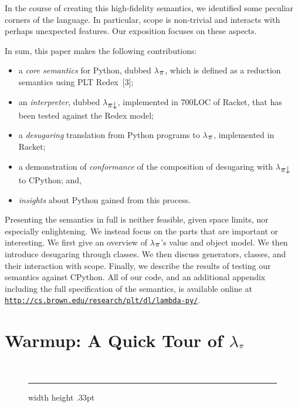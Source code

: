 \documentclass[10pt]{sigplanconf}
\newcommand{\sectionNewpage}{}
\newcommand{\textsub}[1]{$_{\hbox{\textsmaller{#1}}}$}
\newcommand{\Larger}[1]{\textlarger{#1}}
\newlength{\stabLeft}
\newcommand{\atItemizeStart}[0]{\addtolength{\stabLeft}{\labelsep}
                                \addtolength{\stabLeft}{\labelwidth}}
\let\SOriginalthesubsection\thesubsection
\newcommand{\Ssection}[2]{\section[#1]{#2}\let\thesubsection\SOriginalthesubsection}
\newcommand{\Snolinkurl}[1]{\nolinkurl{#1}}
\newcommand{\Legend}[1]{~

                        \hrule width \hsize height .33pt
                        \vspace{4pt}
                        \legend{#1}}
\newcommand{\FigureTarget}[2]{#1}
\newlength{\FigOrigskip}
\newenvironment{Figure}{\begin{figure}}{\end{figure}}
\newenvironment{Centerfigure}{\begin{Xfigure}\centering\item}{\end{Xfigure}}
\newenvironment{Xfigure}{\begin{list}{}{\leftmargin=0pt\topsep=0pt\parsep=\FigOrigskip\partopsep=0pt}}{\end{list}}
\newenvironment{FigureInside}{}{}
\newcommand{\Centertext}[1]{\begin{center}#1\end{center}}
\begin{document}
In the course of creating this high{-}fidelity semantics, we
identified some peculiar corners of the language.
In particular, scope is
non{-}trivial and interacts with perhaps unexpected features. Our
exposition focuses on these aspects.

In sum, this paper makes the following contributions:


\noindent \begin{itemize}\atItemizeStart

\item a \textit{core semantics} for Python, dubbed $\lambda$\textsub{\Larger{$\pi$}}, which
is defined as a reduction semantics using PLT Redex~[3];

\item an \textit{interpreter}, dubbed $\lambda$\textsub{\Larger{$\pi$$\downarrow$}}, implemented in
700LOC of Racket, that has been tested against the Redex model;

\item a \textit{desugaring} translation from Python programs to $\lambda$\textsub{\Larger{$\pi$}},
implemented in Racket;

\item a demonstration of \textit{conformance} of the composition of
desugaring with $\lambda$\textsub{\Larger{$\pi$$\downarrow$}} to CPython; and,

\item \textit{insights} about Python gained from this process.\end{itemize}

Presenting the semantics in full is neither feasible, given space
limits, nor especially enlightening. We instead focus on the parts
that are important or interesting. We first give an overview of
$\lambda$\textsub{\Larger{$\pi$}}{'}s value and object model. We then introduce desugaring
through classes. We then discuss generators,
classes, and their interaction with scope. Finally, we describe the
results of testing our semantics against CPython.  All of our code, and an
additional appendix including the full specification of the semantics,
is available online at \href{http://cs.brown.edu/research/plt/dl/lambda-py/}{\Snolinkurl{http://cs.brown.edu/research/plt/dl/lambda-py/}}.

\sectionNewpage

\Ssection{Warmup: A Quick Tour of $\lambda$\textsub{\Larger{$\pi$}}}{Warmup: A Quick Tour of $\lambda$\textsub{\Larger{$\pi$}}}\label{t:x28part_x22sx3awarmupx22x29}

\begin{Figure}\begin{Centerfigure}\begin{FigureInside}\end{FigureInside}\end{Centerfigure}

\Centertext{\Legend{\FigureTarget{\label{t:x28counter_x28x22figurex22_x22fx3aexprsx22x29x29}Figure~1: }{t:x28counter_x28x22figurex22_x22fx3aexprsx22x29x29}$\lambda$\textsub{\Larger{$\pi$}} expressions}}\end{Figure}
\end{document}
